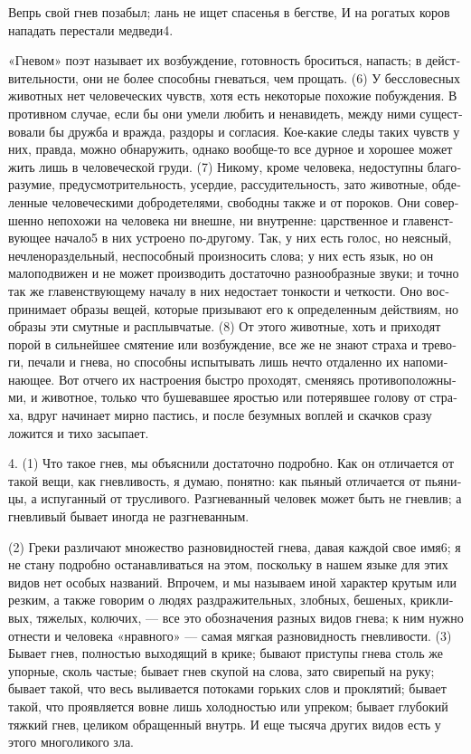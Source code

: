 Вепрь свой гнев поза­был; лань не ищет спа­се­нья в бег­стве, И на рога­тых коров напа­дать пере­ста­ли медведи4.

«Гне­вом» поэт назы­ва­ет их воз­буж­де­ние, готов­ность бро­сить­ся, напасть; в дей­ст­ви­тель­но­сти, они не более спо­соб­ны гне­вать­ся, чем про­щать. (6) У бес­сло­вес­ных живот­ных нет чело­ве­че­ских чувств, хотя есть неко­то­рые похо­жие побуж­де­ния. В про­тив­ном слу­чае, если бы они уме­ли любить и нена­видеть, меж­ду ними суще­ст­во­ва­ли бы друж­ба и враж­да, раздо­ры и согла­сия. Кое-какие следы таких чувств у них, прав­да, мож­но обна­ру­жить, одна­ко вооб­ще-то все дур­ное и хоро­шее может жить лишь в чело­ве­че­ской груди. (7) Нико­му, кро­ме чело­ве­ка, недо­ступ­ны бла­го­ра­зу­мие, пред­у­смот­ри­тель­ность, усер­дие, рас­суди­тель­ность, зато живот­ные, обде­лен­ные чело­ве­че­ски­ми доб­ро­де­те­ля­ми, сво­бод­ны так­же и от поро­ков. Они совер­шен­но непо­хо­жи на чело­ве­ка ни внешне, ни внут­ренне: цар­ст­вен­ное и гла­вен­ст­ву­ю­щее начало5 в них устро­е­но по-дру­го­му. Так, у них есть голос, но неяс­ный, нечле­но­раздель­ный, неспо­соб­ный про­из­но­сить сло­ва; у них есть язык, но он мало­по­дви­жен и не может про­из­во­дить доста­точ­но раз­но­об­раз­ные зву­ки; и точ­но так же гла­вен­ст­ву­ю­ще­му нача­лу в них недо­ста­ет тон­ко­сти и чет­ко­сти. Оно вос­при­ни­ма­ет обра­зы вещей, кото­рые при­зы­ва­ют его к опре­де­лен­ным дей­ст­ви­ям, но обра­зы эти смут­ные и рас­плыв­ча­тые. (8) От это­го живот­ные, хоть и при­хо­дят порой в силь­ней­шее смя­те­ние или воз­буж­де­ние, все же не зна­ют стра­ха и тре­во­ги, печа­ли и гне­ва, но спо­соб­ны испы­ты­вать лишь нечто отда­лен­но их напо­ми­наю­щее. Вот отче­го их настро­е­ния быст­ро про­хо­дят, сме­ня­ясь про­ти­во­по­лож­ны­ми, и живот­ное, толь­ко что буше­вав­шее яро­стью или поте­ряв­шее голо­ву от стра­ха, вдруг начи­на­ет мир­но пастись, и после безум­ных воплей и скач­ков сра­зу ложит­ся и тихо засы­па­ет.

4. (1) Что такое гнев, мы объ­яс­ни­ли доста­точ­но подроб­но. Как он отли­ча­ет­ся от такой вещи, как гнев­ли­вость, я думаю, понят­но: как пья­ный отли­ча­ет­ся от пья­ни­цы, а испу­ган­ный от трус­ли­во­го. Раз­гне­ван­ный чело­век может быть не гнев­лив; а гнев­ли­вый быва­ет ино­гда не раз­гне­ван­ным.

(2) Гре­ки раз­ли­ча­ют мно­же­ство раз­но­вид­но­стей гне­ва, давая каж­дой свое имя6; я не ста­ну подроб­но оста­нав­ли­вать­ся на этом, посколь­ку в нашем язы­ке для этих видов нет осо­бых назва­ний. Впро­чем, и мы назы­ваем иной харак­тер кру­тым или рез­ким, а так­же гово­рим о людях раз­дра­жи­тель­ных, злоб­ных, беше­ных, крик­ли­вых, тяже­лых, колю­чих, --- все это обо­зна­че­ния раз­ных видов гне­ва; к ним нуж­но отне­сти и чело­ве­ка «нрав­но­го» --- самая мяг­кая раз­но­вид­ность гнев­ли­во­сти. (3) Быва­ет гнев, пол­но­стью выхо­дя­щий в кри­ке; быва­ют при­сту­пы гне­ва столь же упор­ные, сколь частые; быва­ет гнев ску­пой на сло­ва, зато сви­ре­пый на руку; быва­ет такой, что весь выли­ва­ет­ся пото­ка­ми горь­ких слов и про­кля­тий; быва­ет такой, что про­яв­ля­ет­ся вовне лишь холод­но­стью или упре­ком; быва­ет глу­бо­кий тяж­кий гнев, цели­ком обра­щен­ный внутрь. И еще тыся­ча дру­гих видов есть у это­го мно­го­ли­ко­го зла.

